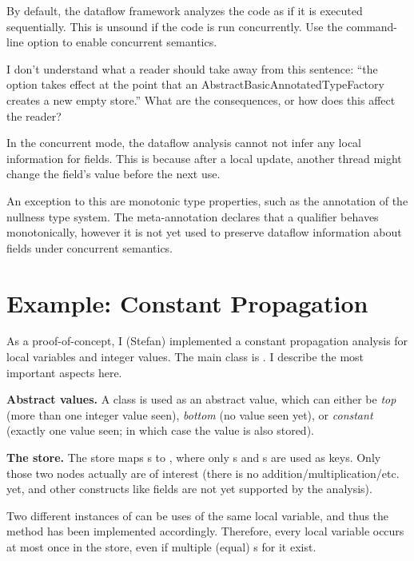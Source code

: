 By default, the dataflow framework analyzes the code as if it is 
executed sequentially.
This is unsound if the code is run concurrently.  Use the
command-line option to enable concurrent semantics.

\begin{workinprogress}
I don't understand what a reader should take away from this sentence:
``the option takes effect at the point that an
AbstractBasicAnnotatedTypeFactory creates a new empty store.''
What are the consequences, or how does this affect the reader?
\end{workinprogress}

In the concurrent mode, the dataflow analysis cannot not infer any local
information for fields.  This is because after a local update, another
thread might change the field's value before the next use.

An exception to this are monotonic type properties, such as the  annotation
of the nullness type system.  The meta-annotation  declares that a qualifier behaves monotonically, however it is not yet used to
preserve dataflow information about fields under concurrent semantics.


\section{Example: Constant Propagation}

    As a proof-of-concept, I (Stefan) implemented a constant propagation analysis for local variables
    and integer values.  The main class is 
    . 
    I describe the most important aspects here.
    
    \textbf{Abstract values.} A class  is used as an abstract value, which can
    either be \emph{top} (more than one integer value seen), \emph{bottom} (no value seen yet),
    or \emph{constant} (exactly one value seen; in which case the value is also stored).
    
    \textbf{The store.} The store maps s to ,
    where only s and s are
    used as keys.  Only those
    two nodes actually are of interest (there is no addition/multiplication/etc. yet, and other constructs like
    fields are not yet supported by the analysis).
    
    Two different instances of  can be uses of the same local variable, and thus
    the  method has been implemented accordingly. Therefore, every local variable occurs
    at most once in the store, even if multiple (equal) s for it exist.
    
